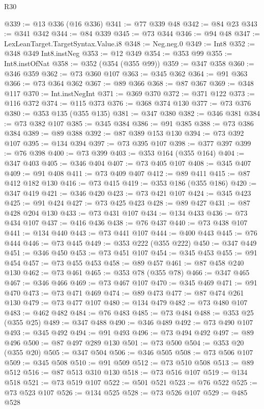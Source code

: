 \begin{lexlean}{R30}
\begin{coremodule}
{{{{{@339 := @13 @336 (@16 @336)
@341 := @77 @339 @48
@342 := @84 @23
@343 := @341 @342
@344 := @84 @339
@345 := @73 @344
@346 := @94 @48
@347 := LexLeanTarget.TargetSyntax.Value.i8
@348 := Neg.neg.{0}
@349 := Int8
@352 := @348 @349 Int8.instNeg
@353 := @12 @349
@354 := @353 @99
@355 := Int8.instOfNat
@358 := @352 (@354 (@355 @99))
@359 := @347 @358
@360 := @346 @359
@362 := @73 @360 @107
@363 := @345 @362
@364 := @91 @363
@366 := @73 @364 @362
@367 := @89 @366
@368 := @87 @367
@369 := @348 @117
@370 := Int.instNegInt
@371 := @369 @370
@372 := @371 @122
@373 := @116 @372
@374 := @115 @373
@376 := @368 @374 @130
@377 := @73 @376
@380 := @353 @135 (@355 @135)
@381 := @347 @380
@382 := @346 @381
@384 := @73 @382 @107
@385 := @345 @384
@386 := @91 @385
@388 := @73 @386 @384
@389 := @89 @388
@392 := @87 @389 @153 @130
@394 := @73 @392 @107
@395 := @134 @394
@397 := @73 @395 @107
@398 := @377 @397
@399 := @76 @398
@400 := @73 @399
@403 := @353 @164 (@355 @164)
@404 := @347 @403
@405 := @346 @404
@407 := @73 @405 @107
@408 := @345 @407
@409 := @91 @408
@411 := @73 @409 @407
@412 := @89 @411
@415 := @87 @412 @182 @130
@416 := @73 @415
@419 := @353 @186 (@355 @186)
@420 := @347 @419
@421 := @346 @420
@423 := @73 @421 @107
@424 := @345 @423
@425 := @91 @424
@427 := @73 @425 @423
@428 := @89 @427
@431 := @87 @428 @204 @130
@433 := @73 @431 @107
@434 := @134 @433
@436 := @73 @434 @107
@437 := @416 @436
@438 := @76 @437
@440 := @73 @438 @107
@441 := @134 @440
@443 := @73 @441 @107
@444 := @400 @443
@445 := @76 @444
@446 := @73 @445
@449 := @353 @222 (@355 @222)
@450 := @347 @449
@451 := @346 @450
@453 := @73 @451 @107
@454 := @345 @453
@455 := @91 @454
@457 := @73 @455 @453
@458 := @89 @457
@461 := @87 @458 @240 @130
@462 := @73 @461
@465 := @353 @78 (@355 @78)
@466 := @347 @465
@467 := @346 @466
@469 := @73 @467 @107
@470 := @345 @469
@471 := @91 @470
@473 := @73 @471 @469
@474 := @89 @473
@477 := @87 @474 @261 @130
@479 := @73 @477 @107
@480 := @134 @479
@482 := @73 @480 @107
@483 := @462 @482
@484 := @76 @483
@485 := @73 @484
@488 := @353 @25 (@355 @25)
@489 := @347 @488
@490 := @346 @489
@492 := @73 @490 @107
@493 := @345 @492
@494 := @91 @493
@496 := @73 @494 @492
@497 := @89 @496
@500 := @87 @497 @289 @130
@501 := @73 @500
@504 := @353 @20 (@355 @20)
@505 := @347 @504
@506 := @346 @505
@508 := @73 @506 @107
@509 := @345 @508
@510 := @91 @509
@512 := @73 @510 @508
@513 := @89 @512
@516 := @87 @513 @310 @130
@518 := @73 @516 @107
@519 := @134 @518
@521 := @73 @519 @107
@522 := @501 @521
@523 := @76 @522
@525 := @73 @523 @107
@526 := @134 @525
@528 := @73 @526 @107
@529 := @485 @528
}}}}}
\end{coremodule}
\end{lexlean}
